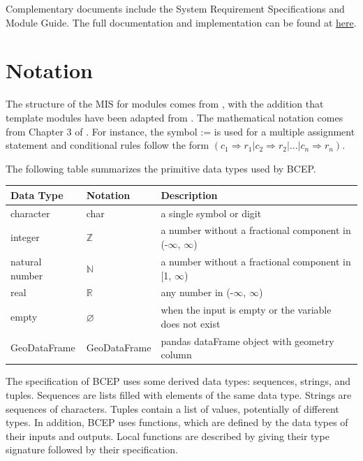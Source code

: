 \documentclass[12pt, titlepage]{article}
\begin{document}
Complementary documents include the System Requirement Specifications
and Module Guide.  The full documentation and implementation can be
found at \href{https://github.com/CynthiaLiu0805/BridgeCorrosion}{here}.

\section{Notation}


The structure of the MIS for modules comes from \citet{HoffmanAndStrooper1995},
with the addition that template modules have been adapted from
\cite{GhezziEtAl2003}.  The mathematical notation comes from Chapter 3 of
\citet{HoffmanAndStrooper1995}.  For instance, the symbol := is used for a
multiple assignment statement and conditional rules follow the form $(c_1
\Rightarrow r_1 | c_2 \Rightarrow r_2 | ... | c_n \Rightarrow r_n )$.

The following table summarizes the primitive data types used by BCEP. 
\begin{center}
\renewcommand{\arraystretch}{1.2}
\noindent 
\begin{tabular}{l l p{7.5cm}} 
\toprule 
\textbf{Data Type} & \textbf{Notation} & \textbf{Description}\\ 
\midrule
character & char & a single symbol or digit\\
integer & $\mathbb{Z}$ & a number without a fractional component in (-$\infty$, $\infty$) \\
natural number & $\mathbb{N}$ & a number without a fractional component in [1, $\infty$) \\
real & $\mathbb{R}$ & any number in (-$\infty$, $\infty$)\\
empty & $\varnothing$ & when the input is empty or the variable does not exist \\
GeoDataFrame & GeoDataFrame &  pandas dataFrame object with geometry column\\
\bottomrule
\end{tabular} 
\end{center}

\noindent
The specification of BCEP uses some derived data types: sequences, strings, and
tuples. Sequences are lists filled with elements of the same data type. Strings
are sequences of characters. Tuples contain a list of values, potentially of
different types. In addition, BCEP uses functions, which
are defined by the data types of their inputs and outputs. Local functions are
described by giving their type signature followed by their specification.
\end{document}
